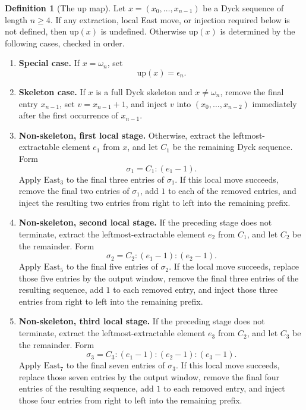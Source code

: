 \documentclass[11pt]{article}
\theoremstyle{plain}
\theoremstyle{definition}
\newtheorem{definition}[theorem]{Definition}
\theoremstyle{remark}
\begin{document}
\begin{definition}[The \(\mathrm{up}\) map]
\label{def:up}
Let \(x=(x_0,\ldots,x_{n-1})\) be a Dyck sequence of length \(n\ge 4\).  If
any extraction, local East move, or injection required below is not defined,
then \(\mathrm{up}(x)\) is undefined.  Otherwise \(\mathrm{up}(x)\) is
determined by the following cases, checked in order.

\begin{enumerate}[label=\textup{(\arabic*)}]
  \item \textbf{Special case.}  If \(x=\omega_n\), set
  \[
    \mathrm{up}(x)=\epsilon_n.
  \]

  \item \textbf{Skeleton case.}  If \(x\) is a full Dyck skeleton and
  \(x\ne\omega_n\), remove the final entry \(x_{n-1}\), set
  \(v=x_{n-1}+1\), and inject \(v\) into
  \((x_0,\ldots,x_{n-2})\) immediately after the first occurrence of
  \(x_{n-1}\).

  \item \textbf{Non-skeleton, first local stage.}  Otherwise, extract the
  leftmost-extractable element \(e_1\) from \(x\), and let \(C_1\) be the
  remaining Dyck sequence.  Form
  \[
    \sigma_1=C_1:(e_1-1).
  \]
  Apply \(\mathrm{East}_3\) to the final three entries of \(\sigma_1\).  If
  this local move succeeds, remove the final two entries of \(\sigma_1\), add
  \(1\) to each of the removed entries, and inject the resulting two entries
  from right to left into the remaining prefix.

  \item \textbf{Non-skeleton, second local stage.}  If the preceding stage
  does not terminate, extract the leftmost-extractable element \(e_2\) from
  \(C_1\), and let \(C_2\) be the remainder.  Form
  \[
    \sigma_2=C_2:(e_1-1):(e_2-1).
  \]
  Apply \(\mathrm{East}_5\) to the final five entries of \(\sigma_2\).  If the
  local move succeeds, replace those five entries by the output window, remove
  the final three entries of the resulting sequence, add \(1\) to each removed
  entry, and inject those three entries from right to left into the remaining
  prefix.

  \item \textbf{Non-skeleton, third local stage.}  If the preceding stage does
  not terminate, extract the leftmost-extractable element \(e_3\) from
  \(C_2\), and let \(C_3\) be the remainder.  Form
  \[
    \sigma_3=C_3:(e_1-1):(e_2-1):(e_3-1).
  \]
  Apply \(\mathrm{East}_7\) to the final seven entries of \(\sigma_3\).  If
  this local move succeeds, replace those seven entries by the output window,
  remove the final four entries of the resulting sequence, add \(1\) to each
  removed entry, and inject those four entries from right to left into the
  remaining prefix.
\end{enumerate}
\end{definition}
\end{document}
